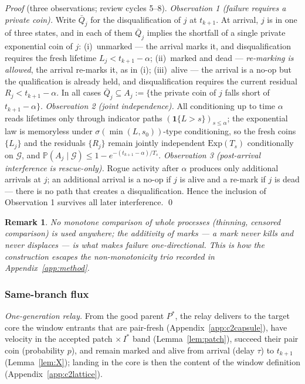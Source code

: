 \documentclass[11pt]{article}
\newtheorem{remark}{Remark}
\newcommand{\PP}{\mathbb{P}}
\newcommand{\Ts}{T_s}
\begin{document}
\noindent\emph{Proof} (three observations; review cycles 5--8).
\emph{Observation 1 (failure requires a private coin).} Write $\bar Q_j$
for the disqualification of $j$ at $t_{k+1}$. At arrival, $j$ is in one of
three states, and in each of them $\bar Q_j$ implies the shortfall of a
single private exponential coin of $j$: (i)~unmarked --- the arrival marks
it, and disqualification requires the fresh lifetime $L_j<t_{k+1}-\alpha$;
(ii)~marked and dead --- \emph{re-marking is allowed}, the arrival re-marks
it, as in (i); (iii)~alive --- the arrival is a no-op but the qualification
is already held, and disqualification requires the current residual
$R_j<t_{k+1}-\alpha$. In all cases $\bar Q_j\subseteq A_j:=\{$the private
coin of $j$ falls short of $t_{k+1}-\alpha\}$.
\emph{Observation 2 (joint independence).} All conditioning up to time
$\alpha$ reads lifetimes only through indicator paths
$(\mathbf 1\{L>s\})_{s\le\alpha}$; the exponential law is memoryless under
$\sigma(\min(L,s_0))$-type conditioning, so the fresh coins $\{L_j\}$ and
the residuals $\{R_j\}$ remain jointly independent $\mathrm{Exp}(\Ts)$
conditionally on $\mathcal G$, and
$\PP(A_j\mid\mathcal G)\le1-e^{-(t_{k+1}-\alpha)/\Ts}$.
\emph{Observation 3 (post-arrival interference is rescue-only).} Rogue
activity after $\alpha$ produces only additional arrivals at $j$; an
additional arrival is a no-op if $j$ is alive and a re-mark if $j$ is dead
--- there is no path that creates a disqualification. Hence the inclusion
of Observation 1 survives all later interference. \qed

\begin{remark}
No monotone comparison of whole processes (thinning, censored comparison)
is used anywhere; the additivity of marks --- a mark never kills and never
displaces --- is what makes failure one-directional. This is how the
construction escapes the non-monotonicity trio recorded in
Appendix~\ref{app:method}.
\end{remark}

\subsubsection{Same-branch flux}\label{app:c2flux}

\emph{One-generation relay.} From the good parent $P^*$, the relay
delivers to the target core the window entrants that are pair-fresh
(Appendix~\ref{app:c2capsule}), have velocity in the accepted patch
$\times\,I^*$ band (Lemma~\ref{lem:patch}), succeed their pair coin
(probability $p$), and remain marked and alive from arrival (delay $\tau$)
to $t_{k+1}$ (Lemma~\ref{lem:X}); landing in the core is then the content
of the window definition (Appendix~\ref{app:c2lattice}).
\end{document}
